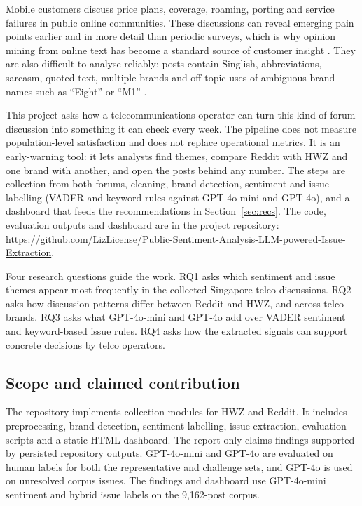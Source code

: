 \documentclass[11pt,a4paper]{article}
\begin{document}
Mobile customers discuss price plans, coverage, roaming, porting and service failures in public online communities. These discussions can reveal emerging pain points earlier and in more detail than periodic surveys, which is why opinion mining from online text has become a standard source of customer insight \cite{pang2008opinion}. They are also difficult to analyse reliably: posts contain Singlish, abbreviations, sarcasm, quoted text, multiple brands and off-topic uses of ambiguous brand names such as ``Eight'' or ``M1'' \cite{liu2012sentiment}.

This project asks how a telecommunications operator can turn this kind of forum discussion into something it can check every week. The pipeline does not measure population-level satisfaction and does not replace operational metrics. It is an early-warning tool: it lets analysts find themes, compare Reddit with HWZ and one brand with another, and open the posts behind any number. The steps are collection from both forums, cleaning, brand detection, sentiment and issue labelling (VADER and keyword rules against GPT-4o-mini and GPT-4o), and a dashboard that feeds the recommendations in Section~\ref{sec:recs}. The code, evaluation outputs and dashboard are in the project repository: \url{https://github.com/LizLicense/Public-Sentiment-Analysis-LLM-powered-Issue-Extraction}.

Four research questions guide the work. RQ1 asks which sentiment and issue themes appear most frequently in the collected Singapore telco discussions. RQ2 asks how discussion patterns differ between Reddit and HWZ, and across telco brands. RQ3 asks what GPT-4o-mini and GPT-4o add over VADER sentiment and keyword-based issue rules. RQ4 asks how the extracted signals can support concrete decisions by telco operators.

\subsection{Scope and claimed contribution}

The repository implements collection modules for HWZ and Reddit. It includes preprocessing, brand detection, sentiment labelling, issue extraction, evaluation scripts and a static HTML dashboard. The report only claims findings supported by persisted repository outputs. GPT-4o-mini and GPT-4o are evaluated on human labels for both the representative and challenge sets, and GPT-4o is used on unresolved corpus issues. The findings and dashboard use GPT-4o-mini sentiment and hybrid issue labels on the 9,162-post corpus.
\end{document}
